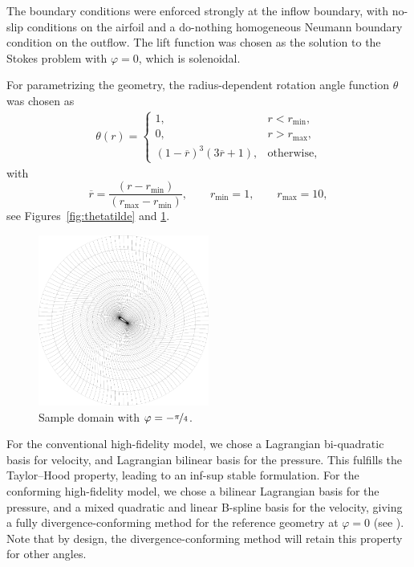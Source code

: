 \documentclass[onecolumn, twoside, a4paper, 11pt]{article}
\begin{document}
The boundary conditions were enforced strongly at the inflow boundary,
with no-slip conditions on the airfoil and a do-nothing homogeneous Neumann
boundary condition on the outflow. The lift function was chosen as the
solution to the Stokes problem with $\varphi=0$, which is solenoidal.

For parametrizing the geometry, the radius-dependent rotation angle function
$\theta$ was chosen as
\begin{align}
  \theta(r) = \begin{cases}
    1, & r < r_\text{min}, \\
    0, & r > r_\text{max}, \\
    (1-\overline{r})^3 (3\overline{r}+1), & \text{otherwise},
  \end{cases}
\end{align}
with
\[
  \overline{r} = \frac{(r - r_\text{min})}{(r_\text{max} - r_\text{min})},
  \qquad r_\text{min} = 1, \qquad r_\text{max} = 10,
\]
see Figures~\ref{fig:thetatilde} and \ref{fig:domain}.

\begin{figure}
  \begin{center}
    \includegraphics[width=0.5\textwidth]{figs/domain}
  \end{center}
  \caption{Sample domain with $\varphi = -\nicefrac{\pi}{4}$.}
  \label{fig:domain}
\end{figure}

For the conventional high-fidelity model, we chose a Lagrangian bi-quadratic basis for velocity,
and Lagrangian bilinear basis for the pressure. This fulfills the Taylor--Hood property, leading to an
inf-sup stable formulation. For the conforming high-fidelity model, we chose a bilinear Lagrangian basis for the
pressure, and a mixed quadratic and linear B-spline basis for the velocity, giving a fully
divergence-conforming method for the reference geometry at $\varphi=0$ (see
\cite{Evans2013idc1}). Note that by design, the divergence-conforming method will retain this
property for other angles.
\end{document}

